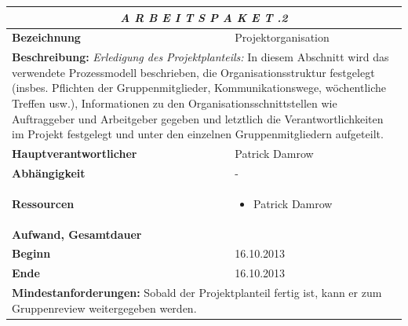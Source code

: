 \documentclass[fontsize=12pt,paper=a4,twoside]{scrartcl}
\begin{document}
\begin{tabular}{p{7.5cm}|p{7.5cm}}\toprule
\multicolumn{2}{c}{\textbf{\textit{A R B E I T S P A K E T \quad 1.1.2}}} \\ \toprule \hline
\textbf{Bezeichnung} & Projektorganisation\\\hline
\multicolumn{2}{p{15cm}}{\textbf{Beschreibung:} \newline 
\textit{Erledigung des Projektplanteils:} In diesem Abschnitt wird das verwendete Prozessmodell beschrieben, die Organisationsstruktur festgelegt (insbes. Pflichten der Gruppenmitglieder, Kommunikationswege, wöchentliche Treffen usw.), Informationen zu den Organisationsschnittstellen wie Auftraggeber und Arbeitgeber gegeben und letztlich die Verantwortlichkeiten im Projekt festgelegt und unter den einzelnen Gruppenmitgliedern aufgeteilt.    }  \\\hline
\textbf{Hauptverantwortlicher} & Patrick Damrow\\\hline
\textbf{Abhängigkeit} & -\\\hline
\textbf{Ressourcen} & \begin{itemize}
\itemsep0pt
\item Patrick Damrow
\end{itemize} \\\hline
\textbf{Aufwand, Gesamtdauer} & \\\hline
\textbf{Beginn} & 16.10.2013 \\\hline
\textbf{Ende} & 16.10.2013\\\hline
\multicolumn{2}{p{15cm}}{\textbf{Mindestanforderungen: } \newline
Sobald der Projektplanteil fertig ist, kann er zum Gruppenreview weitergegeben werden. }  \\ \toprule
\end{tabular} \\\\
\end{document}
